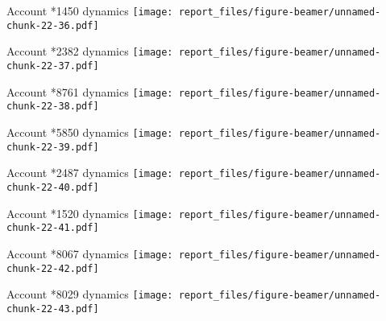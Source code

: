 \documentclass[ignorenonframetext,]{beamer}
\begin{document}
\begin{frame}{Account *1450 dynamics
\texttt{[image: report\_files/figure-beamer/unnamed-chunk-22-36.pdf]}}
\protect\hypertarget{account-1450-dynamics-1}{}

\end{frame}

\begin{frame}{Account *2382 dynamics
\texttt{[image: report\_files/figure-beamer/unnamed-chunk-22-37.pdf]}}
\protect\hypertarget{account-2382-dynamics}{}

\end{frame}

\begin{frame}{Account *8761 dynamics
\texttt{[image: report\_files/figure-beamer/unnamed-chunk-22-38.pdf]}}
\protect\hypertarget{account-8761-dynamics-1}{}

\end{frame}

\begin{frame}{Account *5850 dynamics
\texttt{[image: report\_files/figure-beamer/unnamed-chunk-22-39.pdf]}}
\protect\hypertarget{account-5850-dynamics-1}{}

\end{frame}

\begin{frame}{Account *2487 dynamics
\texttt{[image: report\_files/figure-beamer/unnamed-chunk-22-40.pdf]}}
\protect\hypertarget{account-2487-dynamics-1}{}

\end{frame}

\begin{frame}{Account *1520 dynamics
\texttt{[image: report\_files/figure-beamer/unnamed-chunk-22-41.pdf]}}
\protect\hypertarget{account-1520-dynamics-1}{}

\end{frame}

\begin{frame}{Account *8067 dynamics
\texttt{[image: report\_files/figure-beamer/unnamed-chunk-22-42.pdf]}}
\protect\hypertarget{account-8067-dynamics-1}{}

\end{frame}

\begin{frame}{Account *8029 dynamics
\texttt{[image: report\_files/figure-beamer/unnamed-chunk-22-43.pdf]}}
\protect\hypertarget{account-8029-dynamics-1}{}

\end{frame}
\end{document}
